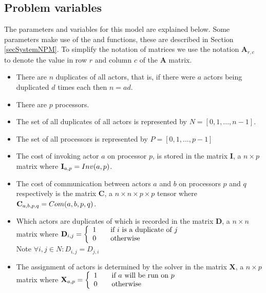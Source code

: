 \subsection{Problem variables}
\label{secModVars}


The parameters and variables for this model are explained below.
Some parameters make use of the  and  functions, these are described in Section \ref{secSystemNPM}.
To simplify the notation of matrices we use the notation $\mathbf{A}_{r,c}$ to denote the value in row $r$ and column $c$ of the $\mathbf{A}$ matrix.

\begin{itemize}
	\item There are $n$ duplicates of all actors, that is, if there were $a$ actors being duplicated $d$ times each then $n = ad$.
	\item There are $p$ processors.
	\item The set of all duplicates of all actors is represented by $N = [0, 1, ..., n-1]$.
	\item The set of all processors is represented by $P = [0, 1, ..., p-1]$
	\item The cost of invoking actor $a$ on processor $p$, is stored in the matrix $\mathbf{I}$, a $n \times p$ matrix where $\mathbf{I}_{a,p} = Inv(a, p)$.
	\item The cost of communication between actors $a$ and $b$ on processors $p$ and $q$ respectively is the matrix $\mathbf{C}$, a $n \times n \times p \times p$ tensor where $\mathbf{C}_{a,b,p,q} = Com(a, b, p, q)$.
	\item Which actors are duplicates of which is recorded in the matrix $\mathbf{D}$, a $n \times n$ matrix where $\mathbf{D}_{i,j} = \mbox{$\left\{ 
		\begin{array}{l l}
			1 \quad & \mbox{if $i$ is a duplicate of $j$}\\
			0 & \mbox{otherwise}\\ \end{array} \right.$}$ \\ Note $\forall i, j \in N : D_{i,j} = D_{j,i}$ 
	\item The assignment of actors is determined by the solver in the matrix $\mathbf{X}$, a $n \times p$ matrix where $\mathbf{X}_{a,p} = \mbox{$\left\{ 
		\begin{array}{l l}
			1 \quad & \mbox{if $a$ will be run on $p$}\\
			0 & \mbox{otherwise}\\ \end{array} \right.$}$
\end{itemize}


